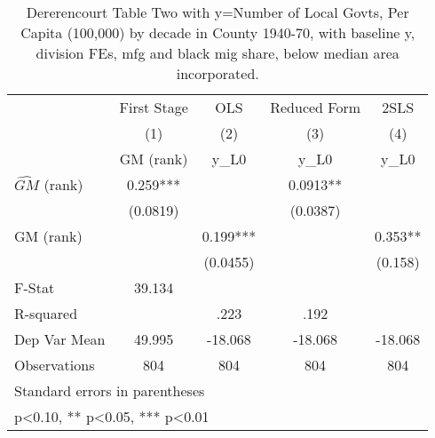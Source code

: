 \begin{table}[htbp]\centering
\def\sym#1{\ifmmode^{#1}\else\(^{#1}\)\fi}
\caption{Dererencourt Table Two with y=Number of Local Govts, Per Capita (100,000) by decade in County 1940-70, with baseline y, division FEs, mfg and black mig share, below median area incorporated.}
\begin{tabular}{l*{4}{c}}
\toprule
                    & First Stage   &         OLS   &Reduced Form   &        2SLS   \\
                    &\multicolumn{1}{c}{(1)}&\multicolumn{1}{c}{(2)}&\multicolumn{1}{c}{(3)}&\multicolumn{1}{c}{(4)}\\
                    &\multicolumn{1}{c}{GM  (rank)}&\multicolumn{1}{c}{y\_L0}&\multicolumn{1}{c}{y\_L0}&\multicolumn{1}{c}{y\_L0}\\
\midrule
$\hat{GM}$ (rank)   &       0.259***&               &      0.0913** &               \\
                    &    (0.0819)   &               &    (0.0387)   &               \\
\addlinespace
GM  (rank)          &               &       0.199***&               &       0.353** \\
                    &               &    (0.0455)   &               &     (0.158)   \\
\midrule
F-Stat              &      39.134   &               &               &               \\
R-squared           &               &        .223   &        .192   &               \\
Dep Var Mean        &      49.995   &     -18.068   &     -18.068   &     -18.068   \\
Observations        &         804   &         804   &         804   &         804   \\
\bottomrule
\multicolumn{5}{l}{\footnotesize Standard errors in parentheses}\\
\multicolumn{5}{l}{\footnotesize * p<0.10, ** p<0.05, *** p<0.01}\\
\end{tabular}
\end{table}
